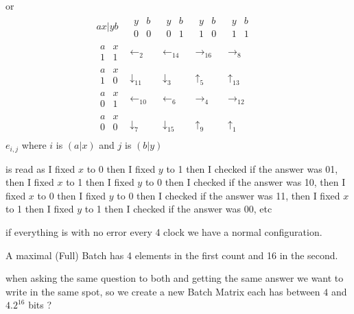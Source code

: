 \documentclass{article}
\begin{document}
or
 $$
\begin{matrix}
ax|yb&\begin{matrix} y&b\\ 0&0\end{matrix}&\begin{matrix} y&b\\ 0&1\end{matrix}&\begin{matrix} y&b\\ 1&0\end{matrix}&\begin{matrix} y&b\\ 1&1\end{matrix}&\\
\begin{matrix} a& x\\1 &1\end{matrix}& \leftarrow_{2} &\leftarrow_{14} & \rightarrow_{16} &\rightarrow_{8}\\
\begin{matrix} a& x\\1 &0\end{matrix}& \downarrow_{11} &\downarrow_{3} & \uparrow_{5} &\uparrow_{13}\\
\begin{matrix} a& x\\0 &1\end{matrix}& \leftarrow_{10} &\leftarrow_{6} & \rightarrow_{4} &\rightarrow_{12}\\
\begin{matrix} a& x\\0 &0\end{matrix}& \downarrow_{7} &\downarrow_{15} & \uparrow_{9} &\uparrow_{1}\\
\end{matrix}
$$
$e_{i,j}$ where $i$ is $(a|x)$ and $j$ is $(b|y)$


is read as I fixed $x$ to 0  then I fixed $y$ to 1 then I checked if  the answer was 01, 
then  I fixed $x$ to 1  then I fixed $y$ to 0 then I checked if  the answer was 10, 
then  I fixed $x$ to 0  then I fixed $y$ to 0 then I checked if  the answer was 11, 
then  I fixed $x$ to 1  then I fixed $y$ to 1 then I checked if  the answer was 00, 
etc

if everything is with no error every 4 clock we have a normal configuration.


A maximal (Full) Batch has 4 elements in the first count and 16 in the second.

when asking the same question to both and getting the same answer we want to write in the same spot, so we create a new Batch Matrix each has between $4$ and $4.2^{16}$ bits ?
\end{document}
